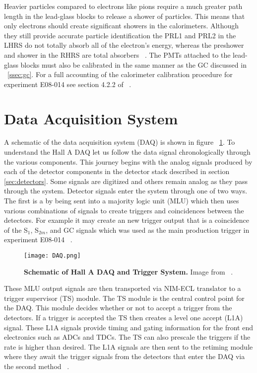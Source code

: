 Heavier particles compared to electrons like pions require a much greater path length in the lead-glass blocks to release a shower of particles. This means that only electrons should create significant showers in the calorimeters. Although they still provide accurate particle identification the PRL1 and PRL2 in the LHRS do not totally absorb all of the electron's energy, whereas the preshower and shower in the RHRS are total absorbers ~\cite{Thesis:Ye}. The PMTs attached to the lead-glass blocks must also be calibrated in the same manner as the GC discussed in ~\ref{ssec:gc}. For a full accounting of the calorimeter calibration procedure for experiment E08-014 see section 4.2.2 of ~\cite{Thesis:Ye}.

\section{Data Acquisition System}
\label{sec:daq}

A schematic of the data acquisition system (DAQ) is shown in figure ~\ref{fig:daq}. To understand the Hall A DAQ let us follow the data signal chronologically through the various components. This journey begins with the analog signals produced by each of the detector components in the detector stack described in section \ref{sec:detectors}. Some signals are digitized and others remain analog as they pass through the system. Detector signals enter the system through one of two ways. The first is a by being sent into a majority logic unit (MLU) which then uses various combinations of signals to create triggers and coincidences between the detectors. For example it may create an new trigger output that is a coincidence of the S$_1$, S$_{2m}$, and GC signals which was used as the main production trigger in experiment E08-014 ~\cite{DAQ}. 

\begin{figure}[!ht]
\begin{center}
\texttt{[image: DAQ.png]}
\end{center}
\caption{
{\bf{Schematic of Hall A DAQ and Trigger System.}} Image from ~\cite{DAQ}.}
\label{fig:daq}
\end{figure}

These MLU output signals are then transported via NIM-ECL translator to a trigger supervisor (TS) module. The TS module is the central control point for the DAQ. This module decides whether or not to accept a trigger from the detectors. If a trigger is accepted the TS then creates a level one accept (L1A) signal. These L1A signals provide timing and gating information for the front end electronics such as ADCs and TDCs. The TS can also prescale the triggers if the rate is higher than desired. The L1A signals are then sent to the retiming module where they await the trigger signals from the detectors that enter the DAQ via the second method ~\cite{DAQ}.

